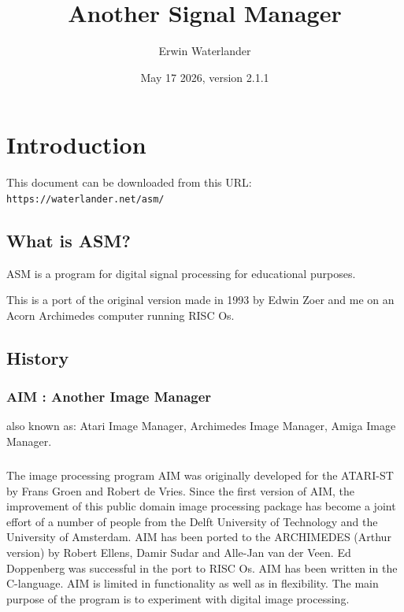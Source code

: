 \documentclass{report}
\title{Another Signal Manager}
\author{Erwin Waterlander}
\date{May 17 2026, version 2.1.1}          %
\begin{document}

\maketitle                   %

\tableofcontents

\chapter{Introduction}\label{chap:intro}

This document can be downloaded from this URL:\\
\texttt{https://waterlander.net/asm/}


\section{What is ASM?}


ASM is a program for digital signal processing for educational
purposes.

This is a port of the original version made in 1993 by Edwin Zoer and me on an
Acorn Archimedes computer running RISC Os.

\section{History}

\subsection{AIM : Another Image Manager}

also known as:
Atari Image Manager,
Archimedes Image Manager,
Amiga Image Manager. 

\paragraph{}
The image processing program AIM was originally developed for the 
ATARI-ST  by Frans Groen and  Robert de Vries.  Since  the  first 
version  of  AIM, the improvement of  this  public  domain  image 
processing  package  has  become a joint effort of  a  number  of 
people from the Delft University of Technology and the University 
of  Amsterdam.
AIM has been ported to the ARCHIMEDES (Arthur version) by  Robert
Ellens, Damir Sudar and Alle-Jan van der Veen.
Ed Doppenberg  was successful in the port to RISC Os. 
AIM has been written in the C-language. 
AIM is limited in functionality as well as in flexibility.
The main  purpose of the program is to experiment with digital
image processing.
\end{document}
